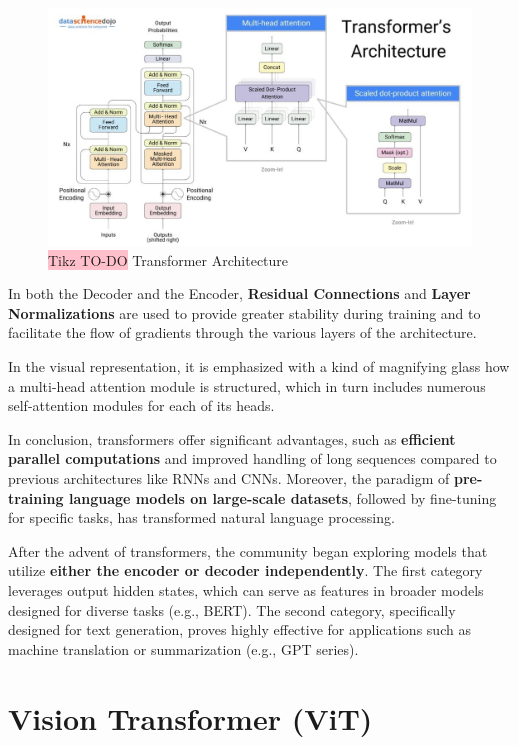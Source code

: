 \begin{figure}[!htbp]
    \centering
    \includegraphics[width=0.85\linewidth]{tikz/chapter8 - TRANSFORMERS.jpg}
    \caption{{\color{red}\colorbox{pink}{Tikz TO-DO}} Transformer Architecture}
\end{figure}

In both the Decoder and the Encoder, \textbf{Residual Connections} and \textbf{Layer Normalizations} are used to provide greater stability during training and to facilitate the flow of gradients through the various layers of the architecture.

In the visual representation, it is emphasized with a kind of magnifying glass how a multi-head attention module is structured, which in turn includes numerous self-attention modules for each of its heads.

In conclusion, transformers offer significant advantages, such as \textbf{efficient parallel computations} and improved handling of long sequences compared to previous architectures like RNNs and CNNs. Moreover, the paradigm of \textbf{pre-training language models on large-scale datasets}, followed by fine-tuning for specific tasks, has transformed natural language processing.

After the advent of transformers, the community began exploring models that utilize \textbf{either the encoder or decoder independently}. The first category leverages output hidden states, which can serve as features in broader models designed for diverse tasks (e.g., BERT). The second category, specifically designed for text generation, proves highly effective for applications such as machine translation or summarization (e.g., GPT series).

\section{Vision Transformer (ViT)}


